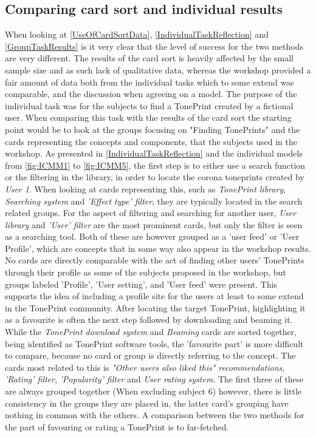 \subsection*{Comparing card sort and individual results}
\label{ComparingIndividualAndCard}
When looking at \autoref{UseOfCardSortData}, \autoref{IndividualTaskReflection} and \autoref{GroupTaskResults} is it very clear that the level of success for the two methods are very different. The results of the card sort is heavily affected by the small sample size and as such lack of qualitative data, whereas the workshop provided a fair amount of data both from the individual tasks which to some extend was comparable, and the discussion when agreeing on a model. The purpose of the individual task was for the subjects to find a TonePrint created by a fictional user. When comparing this task with the results of the card sort the starting point would be to look at the groups focusing on "Finding TonePrints" and the cards representing the concepts and components, that the subjects used in the workshop. As presented in \autoref{IndividualTaskReflection} and the individual models from \autoref{fig:ICMM1} to \autoref{fig:ICMM5}, the first step is to either use a search function or the filtering in the library, in order to locate the corona toneprints created by \textit{User 1}. When looking at cards representing this, such as \textit{TonePrint library}, \textit{Searching system} and \textit{'Effect type' filter}, they are typically located in the search related groups. For the aspect of filtering and searching for another user, \textit{User library} and \textit{'User' filter} are the most prominent cards, but only the filter is seen as a searching tool. Both of these are however grouped as a 'user feed' or 'User Profile', which are concepts that in some way also appear in the workshop results. No cards are directly comparable with the act of finding other users' TonePrints through their profile as some of the subjects proposed in the workshop, but groups labeled 'Profile', 'User setting', and 'User feed' were present. This supports the idea of including a profile site for the users at least to some extend in the TonePrint community. After locating the target TonePrint, highlighting it as a favourite is often the next step followed by downloading and beaming it. While the \textit{TonePrint download system} and \textit{Beaming} cards are sorted together, being identified as TonePrint software tools, the 'favourite part' is more difficult to compare, because no card or group is directly referring to the concept. The cards most related to this is \textit{"Other users also liked this" recommendations}, \textit{'Rating' filter}, \textit{'Popularity' filter} and \textit{User rating system}. The first three of these are always grouped together (When excluding subject 6) however, there is little consistency in the groups they are placed in, the latter card's grouping have nothing in common with the others. A comparison between the two methods for the part of favouring or rating a TonePrint is to far-fetched.

